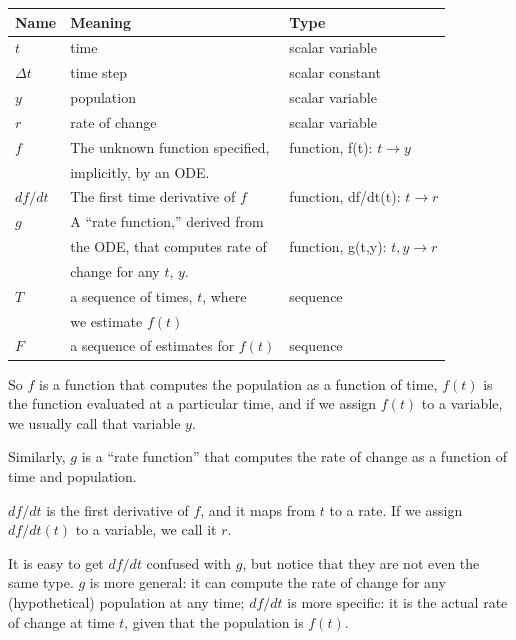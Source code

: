 \documentclass{book}
\begin{document}
\begin{tabular}{|l|l|l|}
\hline
Name     &  Meaning             &  Type  \\
\hline \hline
$t$     &  time                 & scalar variable \\\hline
$\Delta t$  &  time step            & scalar constant \\\hline

$y$     &  population           & scalar variable \\\hline
$r$     &  rate of change       & scalar variable \\\hline

$f$     &  The unknown function specified,    &  function, f(t): $t \to y$  \\
        &  implicitly, by an ODE.             &    \\\hline

$df/dt$  &  The first time derivative of $f$  &  function, df/dt(t): $t \to r$  \\ \hline

$g$     &  A ``rate function,'' derived from     &  \\
        &  the ODE, that computes rate of     &  function, g(t,y): $t, y \to r$  \\
        &  change for any $t$, $y$.           &   \\\hline

$T$     & a sequence of times, $t$, where   & sequence \\
              & we estimate $f(t)$    &           \\\hline
$F$     & a sequence of estimates for $f(t)$  & sequence \\
\hline
\end{tabular}

So $f$ is a function that computes the population as a function of
time, $f(t)$ is the function evaluated at a particular time, and if we
assign $f(t)$ to a variable, we usually call that variable $y$.

Similarly, $g$ is a ``rate function'' that computes the rate of change as a
function of time and population.  

$df/dt$ is the first derivative of $f$, and it maps from $t$ to a
rate.  If we assign $df/dt(t)$ to a variable,
we call it $r$.

It is easy to get $df/dt$ confused with $g$, but notice that they are
not even the same type.  $g$ is more general: it can compute the rate
of change for any (hypothetical) population at any time; $df/dt$
is more specific: it is the actual rate of change at time $t$, given
that the population is $f(t)$.
\end{document}
